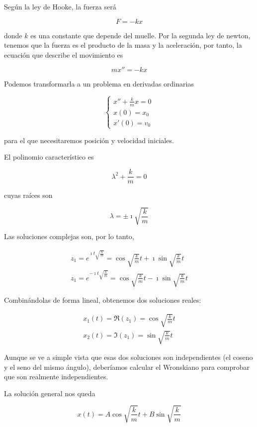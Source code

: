 Según la ley de Hooke, la fuerza será

\[ F = -kx \]

donde $k$ es una constante que depende del muelle. Por la segunda ley de newton, tenemos que la fuerza es el producto de la masa y la aceleración, por tanto, la ecuación que describe el movimiento es

\[ mx'' = -kx \]

Podemos transformarla a un problema en derivadas ordinarias

$$\left\lbrace \begin{array}{l}
x'' + \frac{k}{m}x = 0\\
x(0) = x_0\\
x'(0) = v_0
\end{array}\right. $$

para el que necesitaremos posición y velocidad iniciales.

El polinomio característico es

\[ λ^2 + \frac{k}{m} = 0 \]

cuyas raíces son

\[ λ=\pm \imath \sqrt{\frac{k}{m}} \]

Las soluciones complejas son, por lo tanto,

\begin{gather*}
z_1 = e^{\imath t\sqrt{\frac{k}{m}}} = \cos \sqrt{\frac{k}{m}} t + \imath\sin \sqrt{\frac{k}{m}} t \\
z_1 = e^{-\imath t\sqrt{\frac{k}{m}}} = \cos \sqrt{\frac{k}{m}} t - \imath\sin \sqrt{\frac{k}{m}} t 
\end{gather*}

Combinándolas de forma lineal, obtenemos dos soluciones reales:

\begin{gather*}
x_1(t) = \Re (z_1) = \cos \sqrt{\frac{k}{m}} t \\
x_2(t) = \Im (z_1) = \sin \sqrt{\frac{k}{m}} t
\end{gather*}

Aunque se ve a simple vista que esas dos soluciones son independientes (el coseno y el seno del mismo ángulo), deberíamos calcular el Wronskiano para comprobar que son realmente independientes.

La solución general nos queda

\begin{equation}\label{eqMasaResorte} x(t) = A\cos \sqrt{\frac{k}{m}} t + B \sin \sqrt{\frac{k}{m}} 
\end{equation}

